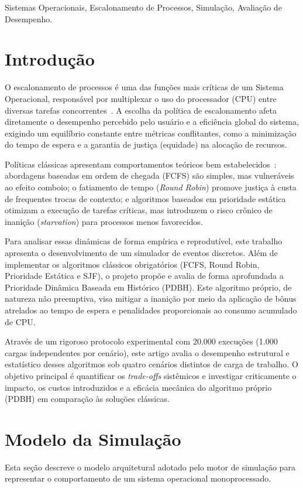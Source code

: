 \documentclass[conference]{IEEEtran}
\begin{document}
\begin{IEEEkeywords}
Sistemas Operacionais, Escalonamento de Processos, Simulação, Avaliação de Desempenho.
\end{IEEEkeywords}

\section{Introdução}
O escalonamento de processos é uma das funções mais críticas de um Sistema Operacional, responsável por multiplexar o uso do processador (CPU) entre diversas tarefas concorrentes~\cite{tanenbaum, stallings}. A escolha da política de escalonamento afeta diretamente o desempenho percebido pelo usuário e a eficiência global do sistema, exigindo um equilíbrio constante entre métricas conflitantes, como a minimização do tempo de espera e a garantia de justiça (equidade) na alocação de recursos.

Políticas clássicas apresentam comportamentos teóricos bem estabelecidos~\cite{silberschatz, tanenbaum}: abordagens baseadas em ordem de chegada (FCFS) são simples, mas vulneráveis ao efeito comboio; o fatiamento de tempo (\textit{Round Robin}) promove justiça à custa de frequentes trocas de contexto; e algoritmos baseados em prioridade estática otimizam a execução de tarefas críticas, mas introduzem o risco crônico de inanição (\textit{starvation}) para processos menos favorecidos.

Para analisar essas dinâmicas de forma empírica e reprodutível, este trabalho apresenta o desenvolvimento de um simulador de eventos discretos. Além de implementar os algoritmos clássicos obrigatórios (FCFS, Round Robin, Prioridade Estática e SJF), o projeto propõe e avalia de forma aprofundada a Prioridade Dinâmica Baseada em Histórico (PDBH). Este algoritmo próprio, de natureza não preemptiva, visa mitigar a inanição por meio da aplicação de bônus atrelados ao tempo de espera e penalidades proporcionais ao consumo acumulado de CPU.

Através de um rigoroso protocolo experimental com 20.000 execuções (1.000 cargas independentes por cenário), este artigo avalia o desempenho estrutural e estatístico desses algoritmos sob quatro cenários distintos de carga de trabalho. O objetivo principal é quantificar os \textit{trade-offs} sistêmicos e investigar criticamente o impacto, os custos introduzidos e a eficácia mecânica do algoritmo próprio (PDBH) em comparação às soluções clássicas.

\section{Modelo da Simulação}
Esta seção descreve o modelo arquitetural adotado pelo motor de simulação para representar o comportamento de um sistema operacional monoprocessado.
\end{document}
